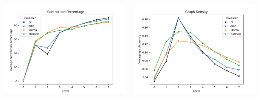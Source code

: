 \begin{minipage}[t]{\textwidth}
    \begin{columns}
    \begin{column}{0.45\textwidth}
        \includegraphics[width=\textwidth]{immagini/Ph1_CP}
    \end{column}
    \begin{column}{0.45\textwidth}
        \includegraphics[width=\textwidth]{immagini/Ph1_GDe}
    \end{column}
        \end{columns}
    \end{minipage}
